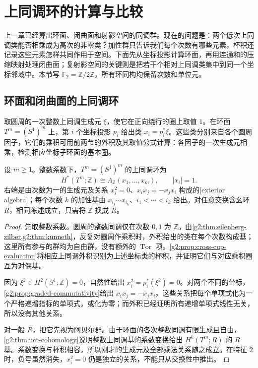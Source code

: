 
% 
% 
% 

\section{上同调环的计算与比较}
\label{g2:sec:0405}

上一章已经算出环面、闭曲面和射影空间的同调群。现在的问题是：两个低次上同调类能否相乘成为高次的非零类？加性群只告诉我们每个次数有哪些元素，杯积还记录这些元素怎样共同作用于空间。下面先从坐标投影计算环面，再用连通和的压缩映射处理闭曲面；复射影空间的关键则是把若干个相对上同调类集中到同一个坐标邻域中。本节写 \(\mathbb F_2=\mathbb Z/2\mathbb Z\)，所有环同构均保留次数和单位元。

\subsection{环面和闭曲面的上同调环}
\label{g2:subsec:0405:01}
取圆周的一次整数上同调生成元 \(\xi\)，使它在正向绕行的圈上取值 \(1\)。在环面 \(T^m=(S^1)^m\) 上，第 \(i\) 个坐标投影 \(p_i\) 给出类 \(x_i=p_i^*\xi\)。这些类分别来自各个圆周因子，它们的乘积可用前两节的外积及其取值公式计算：各因子的一次生成元相乘，检测相应坐标子环面的基本圈。

\begin{proposition}\label{g2:prop:torus-cohomology-ring}
	设 \(m\geq1\)。整数系数下，\(T^m=(S^1)^m\) 的上同调环为
	\[
		H^*(T^m;\mathbb Z)\cong\Lambda_{\mathbb Z}(x_1,\ldots,x_m),\qquad |x_i|=1.
	\]
	右端是由次数为一的生成元及关系 \(x_i^2=0\)、\(x_ix_j=-x_jx_i\) 构成的[exterior algebra]；每个次数 \(k\) 的加性基由 \(x_{i_1}\cdots x_{i_k}\)、\(i_1<\cdots<i_k\) 给出。对任意交换含幺环 \(R\)，相同陈述成立，只需将 \(\mathbb Z\) 换成 \(R\)。
\end{proposition}
\begin{proof}
	先取整数系数。圆周的整数同调仅在次数 \(0,1\) 为 \(\mathbb Z\)。由\cref{g2:thm:eilenberg-zilber,g2:thm:kunneth}，反复对圆周作乘积时，外积给出的类在每个次数构成基；这里所有参与的群均为自由群，没有额外的 \(\operatorname{Tor}\) 项。\cref{g2:prop:cross-cup-evaluation}将相应上同调外积识别为上述坐标类的杯积，并证明它们与对应乘积圈互为对偶基。

	因为 \(\xi^2\in H^2(S^1;\mathbb Z)=0\)，自然性给出 \(x_i^2=p_i^*(\xi^2)=0\)。对两个不同的坐标，\cref{g2:prop:graded-commutativity}给出 \(x_ix_j=-x_jx_i\)。这些关系把每个单项式化为一个严格递增指标的单项式，或化为零；而外积已经证明所有递增单项式线性无关，所以没有其他关系。

	对一般 \(R\)，把它先视为阿贝尔群。由于环面的各次整数同调有限生成且自由，\cref{g2:thm:uct-cohomology}说明整数上同调基的系数变换给出 \(H^k(T^m;R)\) 的 \(R\) 基。系数变换与杯积相容，所以刚才的生成元及全部乘法关系随之成立。在特征 \(2\) 时，负号虽然消失，\(x_i^2=0\) 仍是独立的关系，不能只从交换性中推出。
\end{proof}

